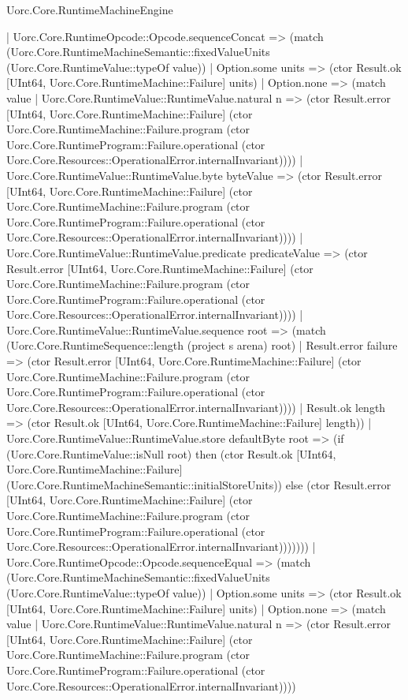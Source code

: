 \begin{lexlean}{Uorc.Core.RuntimeMachineEngine}
\begin{semanticmodule}
{          | Uorc.Core.RuntimeOpcode::Opcode.sequenceConcat => (match (Uorc.Core.RuntimeMachineSemantic::fixedValueUnits (Uorc.Core.RuntimeValue::typeOf value))
            | Option.some units => (ctor Result.ok [UInt64, Uorc.Core.RuntimeMachine::Failure] units)
            | Option.none => (match value
              | Uorc.Core.RuntimeValue::RuntimeValue.natural n => (ctor Result.error [UInt64, Uorc.Core.RuntimeMachine::Failure] (ctor Uorc.Core.RuntimeMachine::Failure.program (ctor Uorc.Core.RuntimeProgram::Failure.operational (ctor Uorc.Core.Resources::OperationalError.internalInvariant))))
              | Uorc.Core.RuntimeValue::RuntimeValue.byte byteValue => (ctor Result.error [UInt64, Uorc.Core.RuntimeMachine::Failure] (ctor Uorc.Core.RuntimeMachine::Failure.program (ctor Uorc.Core.RuntimeProgram::Failure.operational (ctor Uorc.Core.Resources::OperationalError.internalInvariant))))
              | Uorc.Core.RuntimeValue::RuntimeValue.predicate predicateValue => (ctor Result.error [UInt64, Uorc.Core.RuntimeMachine::Failure] (ctor Uorc.Core.RuntimeMachine::Failure.program (ctor Uorc.Core.RuntimeProgram::Failure.operational (ctor Uorc.Core.Resources::OperationalError.internalInvariant))))
              | Uorc.Core.RuntimeValue::RuntimeValue.sequence root => (match (Uorc.Core.RuntimeSequence::length (project s arena) root)
                | Result.error failure => (ctor Result.error [UInt64, Uorc.Core.RuntimeMachine::Failure] (ctor Uorc.Core.RuntimeMachine::Failure.program (ctor Uorc.Core.RuntimeProgram::Failure.operational (ctor Uorc.Core.Resources::OperationalError.internalInvariant))))
                | Result.ok length => (ctor Result.ok [UInt64, Uorc.Core.RuntimeMachine::Failure] length))
              | Uorc.Core.RuntimeValue::RuntimeValue.store defaultByte root => (if (Uorc.Core.RuntimeValue::isNull root) then (ctor Result.ok [UInt64, Uorc.Core.RuntimeMachine::Failure] (Uorc.Core.RuntimeMachineSemantic::initialStoreUnits)) else (ctor Result.error [UInt64, Uorc.Core.RuntimeMachine::Failure] (ctor Uorc.Core.RuntimeMachine::Failure.program (ctor Uorc.Core.RuntimeProgram::Failure.operational (ctor Uorc.Core.Resources::OperationalError.internalInvariant)))))))
          | Uorc.Core.RuntimeOpcode::Opcode.sequenceEqual => (match (Uorc.Core.RuntimeMachineSemantic::fixedValueUnits (Uorc.Core.RuntimeValue::typeOf value))
            | Option.some units => (ctor Result.ok [UInt64, Uorc.Core.RuntimeMachine::Failure] units)
            | Option.none => (match value
              | Uorc.Core.RuntimeValue::RuntimeValue.natural n => (ctor Result.error [UInt64, Uorc.Core.RuntimeMachine::Failure] (ctor Uorc.Core.RuntimeMachine::Failure.program (ctor Uorc.Core.RuntimeProgram::Failure.operational (ctor Uorc.Core.Resources::OperationalError.internalInvariant))))
}
\end{semanticmodule}
\end{lexlean}

